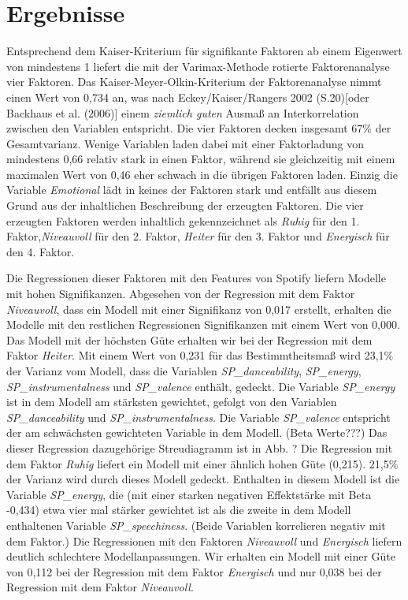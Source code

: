 \section*{Ergebnisse}
\label{sec:Ergebnisse}
Entsprechend dem Kaiser-Kriterium für signifikante Faktoren ab einem Eigenwert von mindestens 1 liefert
die mit der Varimax-Methode rotierte Faktorenanalyse vier Faktoren.
Das Kaiser-Meyer-Olkin-Kriterium der Faktorenanalyse nimmt einen Wert von 0,734 an, was nach Eckey/Kaiser/Rangers 2002 (S.20)[oder Backhaus et al. (2006)] einem \textit{ziemlich guten} Ausmaß an Interkorrelation zwischen den Variablen entspricht.
Die vier Faktoren decken insgesamt 67\% der Gesamtvarianz.
Wenige Variablen laden dabei mit einer Faktorladung von mindestens 0,66 relativ stark in einen Faktor, während sie gleichzeitig mit einem maximalen Wert von 0,46 eher schwach in die übrigen Faktoren laden.
Einzig die Variable \textit{Emotional} lädt in keines der Faktoren stark und entfällt aus diesem Grund aus der inhaltlichen Beschreibung der erzeugten Faktoren.
Die vier erzeugten Faktoren werden inhaltlich gekennzeichnet als \textit{Ruhig} für den 1. Faktor,\textit{Niveauvoll} für den 2.
Faktor, \textit{Heiter} für den 3. Faktor und \textit{Energisch} für den 4. Faktor.   

Die Regressionen dieser Faktoren mit den Features von Spotify liefern Modelle mit hohen Signifikanzen. Abgesehen von der Regression mit dem Faktor \textit{Niveauvoll}, dass ein Modell mit einer Signifikanz von 0,017 erstellt, erhalten die Modelle mit den restlichen Regressionen Signifikanzen mit einem Wert von 0,000. 
Das Modell mit der höchsten Güte erhalten wir bei der Regression mit dem Faktor \textit{Heiter}.
Mit einem Wert von 0,231 für das Bestimmtheitsmaß wird 23,1\% der Varianz vom Modell, dass die Variablen \textit{SP\_danceability}, \textit{SP\_energy}, \textit{SP\_instrumentalness} und \textit{SP\_valence} enthält, gedeckt.
Die Variable \textit{SP\_energy} ist in dem Modell am stärksten gewichtet, gefolgt von den Variablen \textit{SP\_danceability} und \textit{SP\_instrumentalness}. Die Variable \textit{SP\_valence} entspricht der am schwächsten gewichteten Variable in dem Modell. (Beta Werte???)
Das dieser Regression dazugehörige Streudiagramm ist in Abb. ?   
Die Regression mit dem Faktor \textit{Ruhig} liefert ein Modell mit einer ähnlich hohen Güte (0,215).
21,5\% der Varianz wird durch dieses Modell gedeckt.
Enthalten in diesem Modell ist die Variable \textit{SP\_energy}, die (mit einer starken negativen Effektstärke mit Beta -0,434) etwa vier mal stärker gewichtet ist als die zweite in dem Modell enthaltenen Variable \textit{SP\_speechiness}.
(Beide Variablen korrelieren negativ mit dem Faktor.) 
Die  Regressionen mit den Faktoren \textit{Niveauvoll} und \textit{Energisch} liefern deutlich schlechtere Modellanpassungen.
Wir erhalten ein Modell mit einer Güte von 0,112 bei der Regression mit dem Faktor \textit{Energisch} und nur 0,038 bei der Regression mit dem Faktor \textit{Niveauvoll}.

